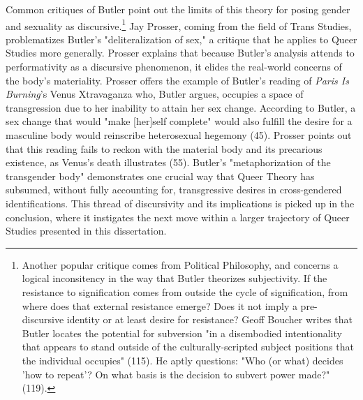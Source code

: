 \documentclass[11pt]{article}
\begin{document}
Common critiques of Butler point out the limits of this theory for
posing gender and sexuality as discursive.\footnote{Another popular critique comes from Political Philosophy, and
concerns a logical inconsitency in the way that Butler theorizes
subjectivity. If the resistance to signification comes from outside
the cycle of signification, from where does that external resistance
emerge? Does it not imply a pre-discursive identity or at least desire
for resistance? Geoff Boucher writes that Butler locates the potential
for subversion "in a disembodied intentionality that appears to stand
outside of the culturally-scripted subject positions that the
individual occupies" (115). He aptly questions: "Who (or what) decides
'how to repeat'? On what basis is the decision to subvert power made?"
(119).} Jay Prosser, coming
from the field of Trans Studies, problematizes Butler's
"deliteralization of sex," a critique that he applies to Queer Studies
more generally. Prosser explains that because Butler's analysis
attends to performativity as a discursive phenomenon, it elides the
real-world concerns of the body's materiality. Prosser offers the
example of Butler's reading of \emph{Paris Is Burning}'s Venus Xtravaganza
who, Butler argues, occupies a space of transgression due to her
inability to attain her sex change. According to Butler, a sex change
that would "make [her]self complete" would also fulfill the desire for
a masculine body would reinscribe heterosexual hegemony (45). Prosser
points out that this reading fails to reckon with the material body
and its precarious existence, as Venus's death illustrates
(55). Butler's "metaphorization of the transgender body" demonstrates
one crucial way that Queer Theory has subsumed, without fully
accounting for, transgressive desires in cross-gendered
identifications. This thread of discursivity and its implications is
picked up in the conclusion, where it instigates the next move within
a larger trajectory of Queer Studies presented in this dissertation.
\end{document}
